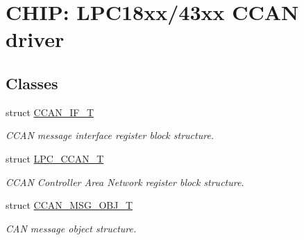 \hypertarget{group___c_c_a_n__18_x_x__43_x_x}{}\section{C\+H\+IP\+: L\+P\+C18xx/43xx C\+C\+AN driver}
\label{group___c_c_a_n__18_x_x__43_x_x}
\subsection*{Classes}
\begin{DoxyCompactItemize}
\item 
struct \hyperlink{struct_c_c_a_n___i_f___t}{C\+C\+A\+N\+\_\+\+I\+F\+\_\+T}
\begin{DoxyCompactList}\small\item\em C\+C\+AN message interface register block structure. \end{DoxyCompactList}\item 
struct \hyperlink{struct_l_p_c___c_c_a_n___t}{L\+P\+C\+\_\+\+C\+C\+A\+N\+\_\+T}
\begin{DoxyCompactList}\small\item\em C\+C\+AN Controller Area Network register block structure. \end{DoxyCompactList}\item 
struct \hyperlink{struct_c_c_a_n___m_s_g___o_b_j___t}{C\+C\+A\+N\+\_\+\+M\+S\+G\+\_\+\+O\+B\+J\+\_\+T}
\begin{DoxyCompactList}\small\item\em C\+AN message object structure. \end{DoxyCompactList}\end{DoxyCompactItemize}
